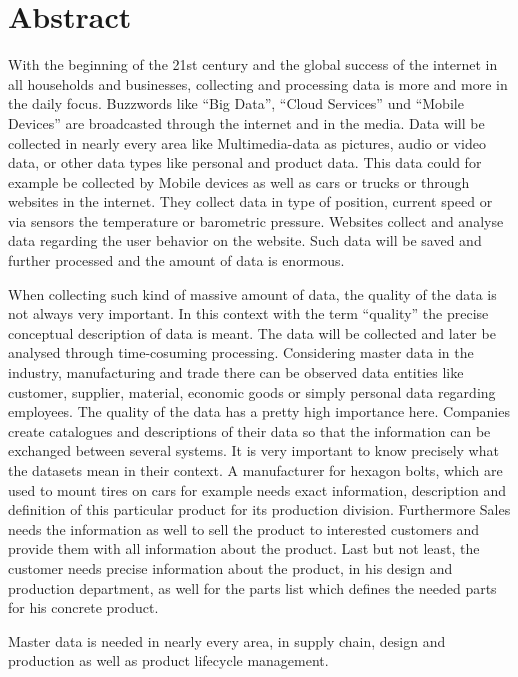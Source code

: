 \chapter*{Abstract}


With the beginning of the 21st century and the global success of the internet in all households and businesses, collecting and processing data is more and more in the daily focus. Buzzwords like \enquote{Big Data}, \enquote{Cloud Services} und \enquote{Mobile Devices} are broadcasted through the internet and in the media. Data will be collected in nearly every area like Multimedia-data as pictures, audio or video data, or other data types like personal and product data. This data could for example be collected by Mobile devices as well as cars or trucks or through websites in the internet. They collect data in type of position, current speed or via sensors the temperature or barometric pressure. Websites collect and analyse data regarding the user behavior on the website. Such data will be saved and further processed and the amount of data is enormous. 

When collecting such kind of massive amount of data, the quality of the data is not always very important. In this context with the term \enquote{quality} the precise conceptual description of data is meant. The data will be collected and later be analysed through time-cosuming processing. 
Considering master data in the industry, manufacturing and trade there can be observed data entities like customer, supplier, material, economic goods or simply personal data regarding employees. The quality of the data has a pretty high importance here. Companies create catalogues and descriptions of their data so that the information can be exchanged between several systems. It is very important to know precisely what the datasets mean in their context. A manufacturer for hexagon bolts, which are used to mount tires on cars for example needs exact information, description and definition of this particular product for its production division. Furthermore Sales needs the information as well to sell the product to interested customers and provide them with all information about the product. Last but not least, the customer needs precise information about the product, in his design and production department, as well for the parts list which defines the needed parts for his concrete product. 

Master data is needed in nearly every area, in supply chain, design and production as well as product lifecycle management. 

